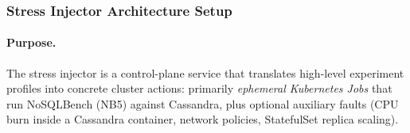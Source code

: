 \documentclass[11pt,a4paper]{article}
\begin{document}
\subsubsection{Stress Injector Architecture Setup}
\label{subsubsec:stress-arch}

\paragraph{Purpose.}
The stress injector is a control-plane service that translates high-level experiment profiles into concrete cluster actions: primarily \emph{ephemeral Kubernetes Jobs} that run NoSQLBench (NB5) against Cassandra, plus optional auxiliary faults (CPU burn inside a Cassandra container, network policies, StatefulSet replica scaling).
\end{document}
